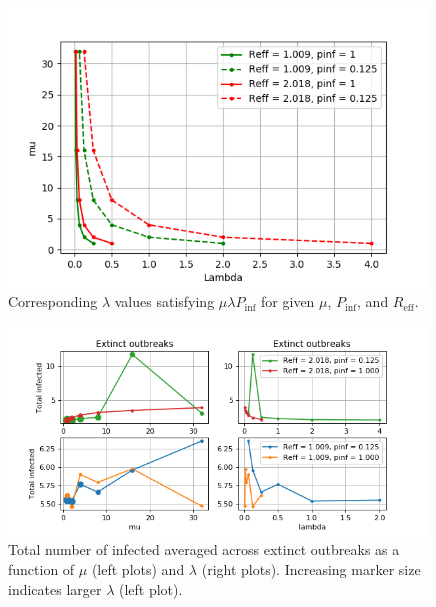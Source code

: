 \documentclass[sr]{drdc-report}
\def\Reff{\ensuremath{R_\mathrm{eff}}}
\def\Pinf{\ensuremath{P_\mathrm{inf}}}
\begin{document}
\begin{figure}
  \includegraphics[width=0.99\textwidth, keepaspectratio=true]{figures/plt_muvslambda}
  \caption{Corresponding $\lambda$ values satisfying $\mu\lambda\Pinf$ for given $\mu$, \Pinf, and \Reff.}\label{fig_plt_muvslambda}
\end{figure}


\begin{figure}
  \includegraphics[width=0.99\textwidth, keepaspectratio=true]{figures/NinfExt_exp1}
  \caption{Total number of infected averaged across extinct outbreaks as a function of $\mu$ (left plots) and $\lambda$ (right plots). Increasing marker size indicates larger $\lambda$  (left plot).}\label{fig_plt_NinfExtExp1}
\end{figure}
\end{document}
